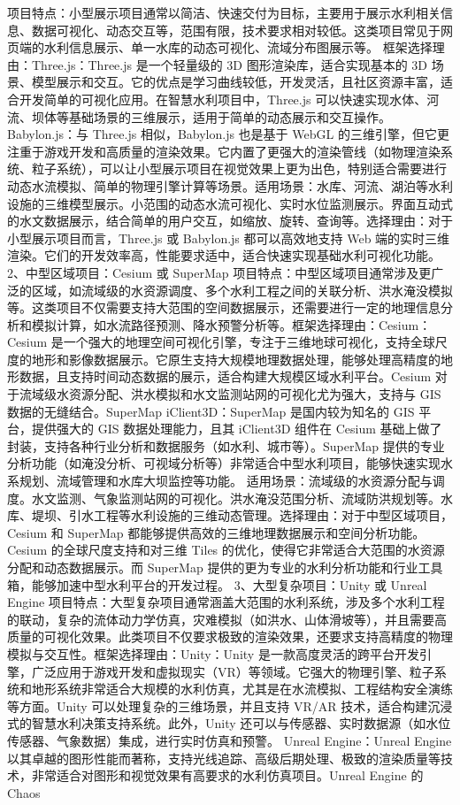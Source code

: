 项目特点：小型展示项目通常以简洁、快速交付为目标，主要用于展示水利相关信息、数据可视化、动态交互等，范围有限，技术要求相对较低。这类项目常见于网页端的水利信息展示、单一水库的动态可视化、流域分布图展示等。 框架选择理由：Three.js：Three.js 是一个轻量级的 3D 图形渲染库，适合实现基本的 3D 场景、模型展示和交互。它的优点是学习曲线较低，开发灵活，且社区资源丰富，适合开发简单的可视化应用。在智慧水利项目中，Three.js 可以快速实现水体、河流、坝体等基础场景的三维展示，适用于简单的动态展示和交互操作。Babylon.js：与 Three.js 相似，Babylon.js 也是基于 WebGL 的三维引擎，但它更注重于游戏开发和高质量的渲染效果。它内置了更强大的渲染管线（如物理渲染系统、粒子系统），可以让小型展示项目在视觉效果上更为出色，特别适合需要进行动态水流模拟、简单的物理引擎计算等场景。适用场景：水库、河流、湖泊等水利设施的三维模型展示。小范围的动态水流可视化、实时水位监测展示。界面互动式的水文数据展示，结合简单的用户交互，如缩放、旋转、查询等。选择理由：对于小型展示项目而言，Three.js 或 Babylon.js 都可以高效地支持 Web 端的实时三维渲染。它们的开发效率高，性能要求适中，适合快速实现基础水利可视化功能。 2、中型区域项目：Cesium 或 SuperMap 项目特点：中型区域项目通常涉及更广泛的区域，如流域级的水资源调度、多个水利工程之间的关联分析、洪水淹没模拟等。这类项目不仅需要支持大范围的空间数据展示，还需要进行一定的地理信息分析和模拟计算，如水流路径预测、降水预警分析等。框架选择理由：Cesium：Cesium 是一个强大的地理空间可视化引擎，专注于三维地球可视化，支持全球尺度的地形和影像数据展示。它原生支持大规模地理数据处理，能够处理高精度的地形数据，且支持时间动态数据的展示，适合构建大规模区域水利平台。Cesium 对于流域级水资源分配、洪水模拟和水文监测站网的可视化尤为强大，支持与 GIS 数据的无缝结合。SuperMap iClient3D：SuperMap 是国内较为知名的 GIS 平台，提供强大的 GIS 数据处理能力，且其 iClient3D 组件在 Cesium 基础上做了封装，支持各种行业分析和数据服务（如水利、城市等）。SuperMap 提供的专业分析功能（如淹没分析、可视域分析等）非常适合中型水利项目，能够快速实现水系规划、流域管理和水库大坝监控等功能。 适用场景：流域级的水资源分配与调度。水文监测、气象监测站网的可视化。洪水淹没范围分析、流域防洪规划等。水库、堤坝、引水工程等水利设施的三维动态管理。选择理由：对于中型区域项目，Cesium 和 SuperMap 都能够提供高效的三维地理数据展示和空间分析功能。Cesium 的全球尺度支持和对三维 Tiles 的优化，使得它非常适合大范围的水资源分配和动态数据展示。而 SuperMap 提供的更为专业的水利分析功能和行业工具箱，能够加速中型水利平台的开发过程。 3、大型复杂项目：Unity 或 Unreal Engine 项目特点：大型复杂项目通常涵盖大范围的水利系统，涉及多个水利工程的联动，复杂的流体动力学仿真，灾难模拟（如洪水、山体滑坡等），并且需要高质量的可视化效果。此类项目不仅要求极致的渲染效果，还要求支持高精度的物理模拟与交互性。框架选择理由：Unity：Unity 是一款高度灵活的跨平台开发引擎，广泛应用于游戏开发和虚拟现实（VR）等领域。它强大的物理引擎、粒子系统和地形系统非常适合大规模的水利仿真，尤其是在水流模拟、工程结构安全演练等方面。Unity 可以处理复杂的三维场景，并且支持 VR/AR 技术，适合构建沉浸式的智慧水利决策支持系统。此外，Unity 还可以与传感器、实时数据源（如水位传感器、气象数据）集成，进行实时仿真和预警。 Unreal Engine：Unreal Engine 以其卓越的图形性能而著称，支持光线追踪、高级后期处理、极致的渲染质量等技术，非常适合对图形和视觉效果有高要求的水利仿真项目。Unreal Engine 的 Chaos 